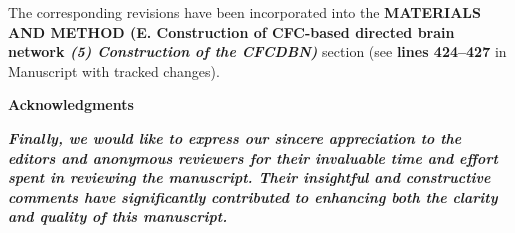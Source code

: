 \documentclass[lettersize,journal]{IEEEtran}
\begin{document}
The corresponding revisions have been incorporated into the \textbf{MATERIALS AND METHOD (E. Construction of CFC-based directed brain network \textit{(5) Construction of the CFCDBN)}} section (see \textbf{lines 424–427} in Manuscript with tracked changes).
\vspace{10mm}


\begin{center}
    {\large \textbf{Acknowledgments}} \\[3mm]
    \begin{minipage}{0.9\textwidth}
   \textit{  \textbf{Finally, we would like to express our sincere appreciation to the editors and anonymous reviewers for their invaluable time and effort spent in reviewing the manuscript. Their insightful and constructive comments have significantly contributed to enhancing both the clarity and quality of this manuscript.}}
    \end{minipage}
\end{center}
\vspace{4mm}









\vspace{11pt}
\vfill
\begin{refcontext}[sorting=none]  
    \printbibliography  
\end{refcontext}
\end{document}
